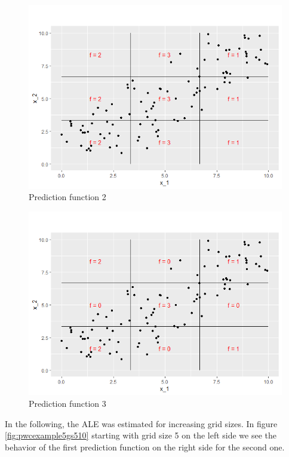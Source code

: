 \documentclass[]{krantz}
\begin{document}
\begin{figure}
\includegraphics[width=1\linewidth]{images/ALE_2_pwc_example5_predf_1_} \caption{Prediction function 2}\label{fig:pwcexample5predf1}
\end{figure}



\begin{figure}
\includegraphics[width=1\linewidth]{images/ALE_2_pwc_example5_predf_2_} \caption{Prediction function 3}\label{fig:pwcexample5predf2}
\end{figure}



In the following, the ALE was estimated for increasing grid sizes. In
figure \ref{fig:pwcexample5gs510} starting with grid size 5 on the left
side we see the behavior of the first prediction function on the right
side for the second one.
\end{document}
